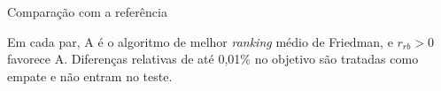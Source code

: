 \documentclass{beamer}
\begin{document}
\begin{frame}{Comparação com a referência}
    \begin{table}
        \centering
        \caption{Comparação par a par pelo teste de Wilcoxon pareado sobre o RPD médio por instância ($N = 50$), com ajuste de Holm. Teste global de Friedman, corrigido para empates: $\chi^2_F(2) = \text{57,32}$, $p < \text{0,001}$.}

        \medskip
        {\scriptsize Em cada par, A é o algoritmo de melhor \textit{ranking} médio de Friedman, e $r_{rb} > 0$ favorece A. Diferenças relativas de até 0,01\% no objetivo são tratadas como empate e não entram no teste.\par}
    \end{table}
\end{frame}
\end{document}
